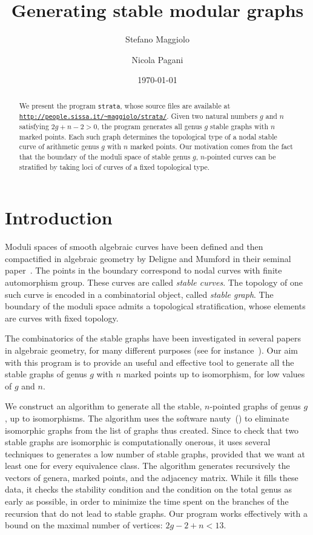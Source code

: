 \documentclass{amsart}
\title{Generating stable modular graphs}
\author{Stefano Maggiolo}
\author{Nicola Pagani}
\date{\today}
\theoremstyle{plain}
\theoremstyle{definition}
\begin{document}
\begin{abstract}
  We present the program \texttt{strata}, whose source files are
  available at \href{http://people.sissa.it/~maggiolo/strata/}
  {\texttt{http://people.sissa.it/\~{}maggiolo/strata/}}. Given two
  natural numbers $g$ and $n$ satisfying $2g+n-2>0$, the program
  generates all genus $g$ stable graphs with $n$ marked points. Each such
  graph determines the topological type of a nodal stable curve of
  arithmetic genus $g$ with $n$ marked points. Our motivation comes
  from the fact that the boundary of the moduli space of stable genus
  $g$, $n$-pointed curves can be stratified by taking loci of curves
  of a fixed topological type.
\end{abstract}

\maketitle
\setcounter{tocdepth}{1}
\tableofcontents


\section{Introduction}
Moduli spaces of smooth algebraic curves have been defined and then
compactified in algebraic geometry by Deligne and Mumford in their
seminal paper~\cite{delignemumford}. The points in the boundary
correspond to nodal curves with finite automorphism group. These
curves are called \emph{stable curves}. The topology of one such curve
is encoded in a combinatorial object, called \emph{stable graph}. The
boundary of the moduli space admits a topological stratification,
whose elements are curves with fixed topology.

The combinatorics of the stable graphs have been investigated in
several papers in algebraic geometry, for many different purposes (see
for instance~\cite{modularoperads,opstall,opstall2,stephanie2}). Our
aim with this program is to provide an useful and effective tool to
generate all the stable graphs of genus $g$ with $n$ marked points up
to isomorphism, for low values of $g$ and $n$.

We construct an algorithm to generate all the stable, $n$-pointed
graphs of genus $g$, up to isomorphisms. The algorithm uses the
software nauty~(\cite{nauty}) to eliminate isomorphic graphs from the
list of graphs thus created. Since to check that two stable graphs are
isomorphic is computationally onerous, it uses several techniques to
generates a low number of stable graphs, provided that we want at
least one for every equivalence class. The algorithm generates
recursively the vectors of genera, marked points, and the adjacency
matrix. While it fills these data, it checks the stability condition
and the condition on the total genus as early as possible, in order to
minimize the time spent on the branches of the recursion that do not
lead to stable graphs. Our program works effectively with a bound on
the maximal number of vertices: $2g-2+n<13$. %
\end{document}
